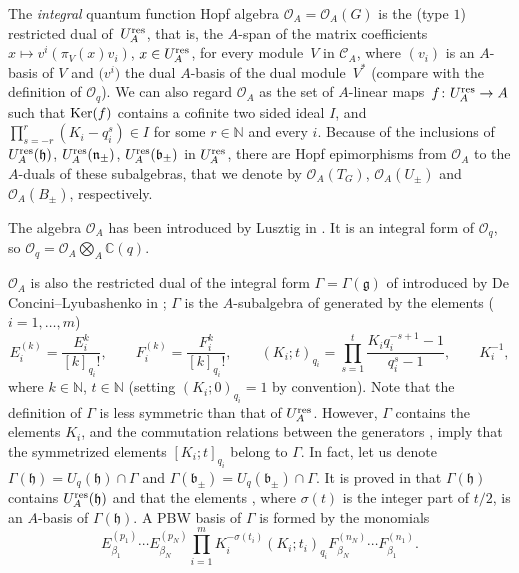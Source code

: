 \documentclass[10pt,a4paper]{amsart}
\numberwithin{equation}{section}
\theoremstyle{definition}
\newcommand{\mc}{\mathbb{C}}
\newcommand{\mn}{\mathbb{N}}
\newcommand{\Oo}{{\mathcal O}}
\newcommand{\ra}{\rightarrow}
\begin{document}
The {\it integral} quantum function Hopf algebra $\Oo_A=\Oo_A(G)$ is the (type $1$) restricted dual of~$U_A^{\rm res}$, that is, the $A$-span of the matrix coefficients $x\mapsto v^i(\pi_V(x)v_i)$, $x\in U_A^{\rm res}$, for every module~$V$ in $\mathcal{C}_A$, where $(v_i)$ is an $A$-basis of $V$ and $\big(v^i\big)$ the dual $A$-basis of the dual module~$V^*$ (compare with the definition of $\Oo_q$). We can also regard $\Oo_A$ as the set of $A$-linear maps~${f\colon U_A^{\rm res}\ra A}$ such that ${\rm Ker}(f)$ contains a cofinite two sided ideal $I$, and $ \prod_{s=-r}^r (K_i - q_i^s) \in I$ for some $r\in \mathbb{N}$ and every $i$. Because of the inclusions of $U_A^{\rm res}(\mathfrak{h})$, $U_A^{\rm res}(\mathfrak{n}_\pm)$, $U_A^{\rm res}(\mathfrak{b}_\pm)$ in $U_A^{\rm res}$, there are Hopf epimorphisms from $\Oo_A$ to the $A$-duals of these subalgebras, that we denote by $\Oo_A(T_G)$, $\Oo_A(U_\pm)$ and $\Oo_A(B_\pm)$, respectively.

The algebra $\Oo_A$ has been introduced by Lusztig in \cite{Lusztig2,Lusztig}. It is an integral form of $\Oo_q$, so $\Oo_q = \Oo_A \bigotimes_A \mc(q)$.

$\Oo_A$ is also the restricted dual of the integral form $\Gamma=\Gamma(\mathfrak{g})$ of  introduced by De Concini--Lyubashenko in \cite[Sections 2 and~3]{DC-L}; $\Gamma$ is the $A$-subalgebra of  generated by the elements ($i=1,\dots,m$)
\[E_i^{(k)}= \frac{E_i^k}{[k]_{q_i}!} ,\qquad F_i^{(k)}= \frac{F_i^k}{[k]_{q_i}!} ,\qquad ( K_i; t )_{q_i}= \prod_{s=1}^t \frac{K_iq_i^{-s+1}-1}{q_i^s-1},\qquad K_i^{-1},\]
where $k\in \mn$, $t\in \mn$ (setting $( K_i; 0)_{q_i}=1$ by convention). Note that the definition of $\Gamma$ is less symmetric than that of $U_A^{\rm res}$. However, $\Gamma$ contains the elements $K_i$, and the commutation relations between the generators ,  imply that the symmetrized elements $[ K_i; t ]_{q_i}$ belong to $\Gamma$. In fact, let us denote $\Gamma(\mathfrak{h}) = U_q(\mathfrak{h}) \cap \Gamma$ and $\Gamma(\mathfrak{b}_\pm) = U_q(\mathfrak{b}_\pm) \cap \Gamma$. It is proved in \cite[Theorem 3.1]{DC-L} that $\Gamma(\mathfrak{h})$ contains $U_A^{\rm res}(\mathfrak{h})$ and that the elements \smash{$ \prod_{i=1}^m K_i^{-\sigma(t_i)}(K_i; t_i)_{q_i}$, $t_i\in \mn$}, where $\sigma(t)$ is the integer part of $t/2$, is an $A$-basis of $\Gamma(\mathfrak{h})$. A PBW basis of $\Gamma$ is formed by the monomials
\[%
E_{\beta_1}^{(p_1)}\cdots E_{\beta_N}^{(p_N)}\prod_{i=1}^m K_i^{-\sigma(t_i)}(K_i; t_i)_{q_i} F_{\beta_N}^{(n_N)}\cdots F_{\beta_1}^{(n_1)}.
\]
\end{document}
